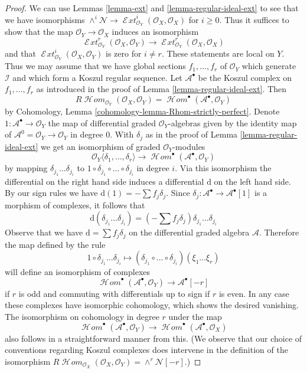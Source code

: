 \documentclass{stacks-project}
\theoremstyle{plain}
\theoremstyle{definition}
\theoremstyle{remark}
\numberwithin{equation}{subsection}
\def\SheafHom{\mathop{\mathcal{H}\!\mathit{om}}\nolimits}
\def\SheafExt{\mathop{\mathcal{E}\!\mathit{xt}}\nolimits}
\begin{document}
\begin{proof}
We can use Lemmas \ref{lemma-ext} and \ref{lemma-regular-ideal-ext}
to see that we have isomorphisms
$\wedge^i\mathcal{N} \to
\SheafExt^i_{\mathcal{O}_Y}(\mathcal{O}_X, \mathcal{O}_X)$
for $i \geq 0$. Thus it suffices to show that the map
$\mathcal{O}_Y \to \mathcal{O}_X$ induces an isomorphism
$$
\SheafExt^r_{\mathcal{O}_Y}(\mathcal{O}_X, \mathcal{O}_Y)
\longrightarrow
\SheafExt^r_{\mathcal{O}_Y}(\mathcal{O}_X, \mathcal{O}_X)
$$
and that
$\SheafExt^i_{\mathcal{O}_Y}(\mathcal{O}_X, \mathcal{O}_Y)$
is zero for $i \not = r$. These statements are local on $Y$. Thus
we may assume that we have global sections $f_1, \ldots, f_r$ of
$\mathcal{O}_Y$ which generate $\mathcal{I}$ and which form a
Koszul regular sequence. Let $\mathcal{A}^\bullet$
be the Koszul complex on $f_1, \ldots, f_r$ as introduced in the proof of
Lemma \ref{lemma-regular-ideal-ext}. Then
$$
R\SheafHom_{\mathcal{O}_Y}(\mathcal{O}_X, \mathcal{O}_Y) =
\SheafHom^\bullet(\mathcal{A}^\bullet, \mathcal{O}_Y)
$$
by Cohomology, Lemma \ref{cohomology-lemma-Rhom-strictly-perfect}.
Denote $1 : \mathcal{A}^\bullet \to \mathcal{O}_Y$ the map of differential
graded $\mathcal{O}_Y$-algebras given by the identity map of
$\mathcal{A}^0 = \mathcal{O}_Y \to \mathcal{O}_Y$ in degree $0$.
With $\delta_j$ as in the proof of Lemma \ref{lemma-regular-ideal-ext}
we get an isomorphism of graded $\mathcal{O}_Y$-modules
$$
\mathcal{O}_Y\langle \delta_1, \ldots, \delta_r\rangle
\longrightarrow
\SheafHom^\bullet(\mathcal{A}^\bullet, \mathcal{O}_Y)
$$
by mapping $\delta_{j_1} \ldots \delta_{j_i}$ to
$1 \circ \delta_{j_1} \circ \ldots \circ \delta_{j_i}$ in degree $i$.
Via this isomorphism the differential on the right hand side
induces a differential $\text{d}$ on the left hand side.
By our sign rules we have $\text{d}(1) = - \sum f_j \delta_j$.
Since $\delta_j : \mathcal{A}^\bullet \to \mathcal{A}^\bullet[1]$
is a morphism of complexes, it follows that
$$
\text{d}(\delta_{j_1} \ldots \delta_{j_i}) =
(- \sum f_j \delta_j )\delta_{j_1} \ldots \delta_{j_i}
$$
Observe that we have $\text{d} = \sum f_j \delta_j$ on the differential
graded algebra $\mathcal{A}$. Therefore the map defined by the rule
$$
1 \circ \delta_{j_1} \ldots \delta_{j_i} \longmapsto
(\delta_{j_1} \circ \ldots \circ \delta_{j_i})(\xi_1 \ldots \xi_r)
$$
will define an isomorphism of complexes
$$
\SheafHom^\bullet(\mathcal{A}^\bullet, \mathcal{O}_Y)
\longrightarrow \mathcal{A}^\bullet[-r]
$$
if $r$ is odd and commuting with differentials up to sign if $r$ is even.
In any case these complexes have isomorphic cohomology, which shows the
desired vanishing. The isomorphism on cohomology in degree $r$
under the map
$$
\SheafHom^\bullet(\mathcal{A}^\bullet, \mathcal{O}_Y)
\longrightarrow
\SheafHom^\bullet(\mathcal{A}^\bullet, \mathcal{O}_X)
$$
also follows in a straightforward manner from this.
(We observe that our choice of conventions regarding
Koszul complexes does intervene in the definition
of the isomorphism
$R\SheafHom_{\mathcal{O}_X}(\mathcal{O}_X, \mathcal{O}_Y) =
\wedge^r \mathcal{N}[-r]$.)
\end{proof}
\end{document}
